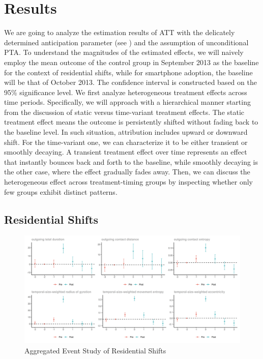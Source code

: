
\chapter{Results}\label{results}
We are going to analyze the estimation results of ATT with the delicately determined anticipation parameter (see ) and the assumption of unconditional PTA.
To understand the magnitudes of the estimated effects, we will naively employ the mean outcome of the control group in September 2013 as the baseline for the context of residential shifts, while for smartphone adoption, the baseline will be that of October 2013.
The confidence interval is constructed based on the 95\% significance level. We first analyze heterogeneous treatment effects across time periods.
Specifically, we will approach with a hierarchical manner starting from the discussion of static versus time-variant treatment effects.
The static treatment effect means the outcome is persistently shifted without fading back to the baseline level.
In such situation, attribution includes upward or downward shift.
For the time-variant one, we can characterize it to be either transient or smoothly decaying.
A transient treatment effect over time represents an effect that instantly bounces back and forth to the baseline, while smoothly decaying is the other case, where the effect gradually fades away.
Then, we can discuss the heterogeneous effect across treatment-timing groups by inspecting whether only few groups exhibit distinct patterns.

\clearpage\newpage
\section{Residential Shifts}\label{main_res_residential_shift}
\begin{figure}[h!]
\centering
\caption{Aggregated Event Study of Residential Shifts}
\vspace{0.1cm}

\includegraphics[scale=0.49]{figures/csdid/residential_shift.png}

\label{fig:event_study_residential_shift}
\end{figure}

